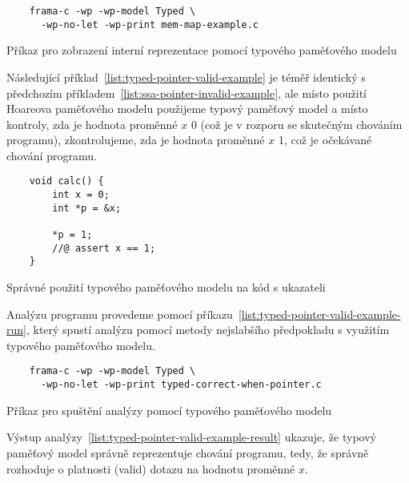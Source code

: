 \begin{listing}[H]
    \begin{verbatim}
    frama-c -wp -wp-model Typed \
      -wp-no-let -wp-print mem-map-example.c
    \end{verbatim}
    \caption{Příkaz pro zobrazení interní reprezentace pomocí typového paměťového modelu}
    \label{list:typed-assign-example-run}
\end{listing}


Následující příklad~\ref{list:typed-pointer-valid-example} je téměř identický
s předchozím příkladem~\ref{list:ssa-pointer-invalid-example},
ale místo použití Hoareova paměťového modelu použijeme typový paměťový model
a místo kontroly, zda je hodnota proměnné $x$ 0 (což je v rozporu se skutečným chováním programu),
zkontrolujeme, zda je hodnota proměnné $x$ 1, což je očekávané chování programu.

\begin{listing}[H]
    \begin{verbatim}
    void calc() {
        int x = 0;
        int *p = &x;

        *p = 1;
        //@ assert x == 1;
    }
    \end{verbatim}
    \caption{Správné použití typového paměťového modelu na kód s ukazateli}
    \label{list:typed-pointer-valid-example}
\end{listing}

Analýzu programu provedeme pomocí příkazu~\ref{list:typed-pointer-valid-example-run},
který spustí analýzu pomocí metody nejslabšího předpokladu s využitím typového paměťového modelu.

\begin{listing}[H]
    \begin{verbatim}
    frama-c -wp -wp-model Typed \
      -wp-no-let -wp-print typed-correct-when-pointer.c
    \end{verbatim}
    \caption{Příkaz pro spuštění analýzy pomocí typového paměťového modelu}
    \label{list:typed-pointer-valid-example-run}
\end{listing}

Výstup analýzy~\ref{list:typed-pointer-valid-example-result} ukazuje,
že typový paměťový model správně reprezentuje chování programu,
tedy, že správně rozhoduje o platnosti (valid) dotazu na hodnotu proměnné $x$.

